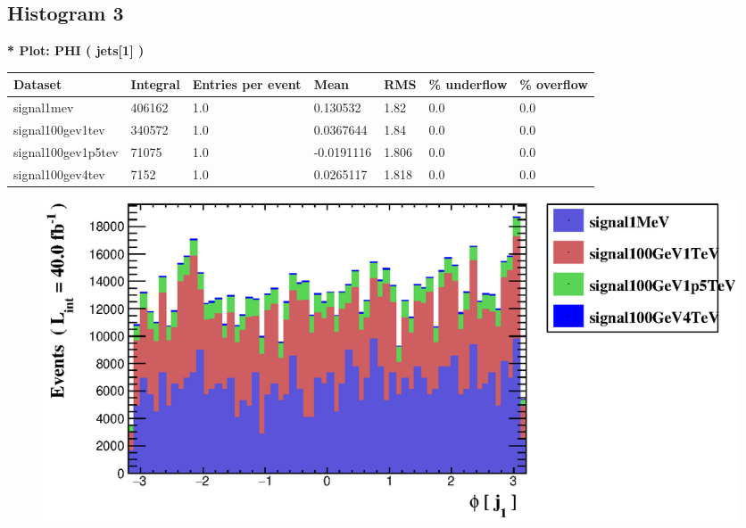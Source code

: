 \documentclass[a4paper, 10pt]{article}
\begin{document}
\subsection{ Histogram 3}

\textbf{* Plot: PHI ( jets[1] ) }\\
   \begin{table}[H]
  \begin{center}
    \begin{tabular}{|m{23.0mm}|m{23.0mm}|m{18.0mm}|m{19.0mm}|m{19.0mm}|m{19.0mm}|m{19.0mm}|}
      \hline
      {\cellcolor{yellow}         Dataset}& {\cellcolor{yellow}         Integral}& {\cellcolor{yellow}         Entries per event}& {\cellcolor{yellow}         Mean}& {\cellcolor{yellow}         RMS}& {\cellcolor{yellow}         \% underflow}& {\cellcolor{yellow}         \% overflow}\\
      \hline
      {\cellcolor{white}         signal1mev}& {\cellcolor{white}         406162}& {\cellcolor{white}         1.0}& {\cellcolor{white}         0.130532}& {\cellcolor{white}         1.82}& {\cellcolor{green}         0.0}& {\cellcolor{green}         0.0}\\
      \hline
      {\cellcolor{white}         signal100gev1tev}& {\cellcolor{white}         340572}& {\cellcolor{white}         1.0}& {\cellcolor{white}         0.0367644}& {\cellcolor{white}         1.84}& {\cellcolor{green}         0.0}& {\cellcolor{green}         0.0}\\
      \hline
      {\cellcolor{white}         signal100gev1p5tev}& {\cellcolor{white}         71075}& {\cellcolor{white}         1.0}& {\cellcolor{white}         -0.0191116}& {\cellcolor{white}         1.806}& {\cellcolor{green}         0.0}& {\cellcolor{green}         0.0}\\
      \hline
      {\cellcolor{white}         signal100gev4tev}& {\cellcolor{white}         7152}& {\cellcolor{white}         1.0}& {\cellcolor{white}         0.0265117}& {\cellcolor{white}         1.818}& {\cellcolor{green}         0.0}& {\cellcolor{green}         0.0}\\
\hline
    \end{tabular}
  \end{center}
\end{table}

\begin{figure}[H]
  \begin{center}
    \includegraphics[scale=0.45]{selection_2.eps}\\
\caption{   }
  \end{center}
\end{figure}
      \newpage
\end{document}
